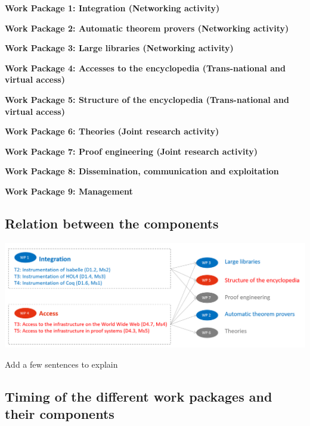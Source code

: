 \begin{workplan}


  \newcommand\na{(Networking activity)}
  \newcommand\tnva{(Trans-national and virtual access)}
  \newcommand\jra{(Joint research activity)}
  \newcommand\titlewp[3]{\bigskip\noindent\colorbox{color3}{\begin{minipage}\textwidth\bf Work Package #1: #2\end{minipage}}}

\titlewp{1}{Integration \na}{instrumentation}

\titlewp{2}{Automatic theorem provers \na}{atpetc}

\titlewp{3}{Large libraries \na}{libraries}

\titlewp{4}{Accesses to the encyclopedia \tnva}{access}

\titlewp{5}{Structure of the encyclopedia \tnva}{structuring}

\titlewp{6}{Theories \jra}{theories}

\titlewp{7}{Proof engineering \jra}{alignment}

\titlewp{8}{Dissemination, communication and exploitation}{dissemination}

\titlewp{9}{Management}{management}

\end{workplan}



\subsection*{Relation between the components}

\includegraphics[width=\textwidth]{img/PERT}

{\color{red} Add a few sentences to explain}

\subsection*{Timing of the different work packages and their components}

